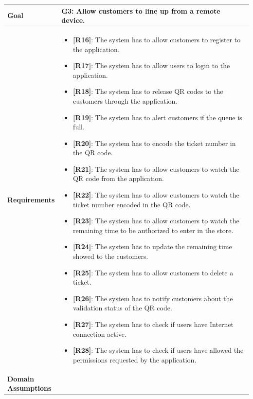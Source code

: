 \begin{table}[H]
    \centering
    \begin{tabular}{| m{} | m{} |}
        \hline
        \textbf{Goal} &
        \textbf{G3: Allow customers to line up from a remote device.} \\
        \hline
        \textbf{Requirements} &
        \begin{itemize}
            \item {\textbf{[R16]}}: The system has to allow customers to register to the application.
            \item {\textbf{[R17]}}: The system has to allow users to login to the application.
            \item {\textbf{[R18]}}: The system has to release QR codes to the customers through the application.
            \item {\textbf{[R19]}}: The system has to alert customers if the queue is full.
            \item {\textbf{[R20]}}: The system has to encode the ticket number in the QR code.
            \item {\textbf{[R21]}}: The system has to allow customers to watch the QR code from the application.
            \item {\textbf{[R22]}}: The system has to allow customers to watch the ticket number encoded in the QR code.
            \item {\textbf{[R23]}}: The system has to allow customers to watch the remaining time to be authorized to enter in the store.
            \item {\textbf{[R24]}}: The system has to update the remaining time showed to the customers.
            \item {\textbf{[R25]}}: The system has to allow customers to delete a ticket.
            \item {\textbf{[R26]}}: The system has to notify customers about the validation status of the QR code.
            \item {\textbf{[R27]}}: The system has to check if users have Internet connection active.
            \item {\textbf{[R28]}}: The system has to check if users have allowed the permissions requested by the application.
        \end{itemize} \\
        \hline
        \shortstack[l]{\textbf{Domain} \\ \textbf{Assumptions}} &

\end{tabular}
\end{table}
